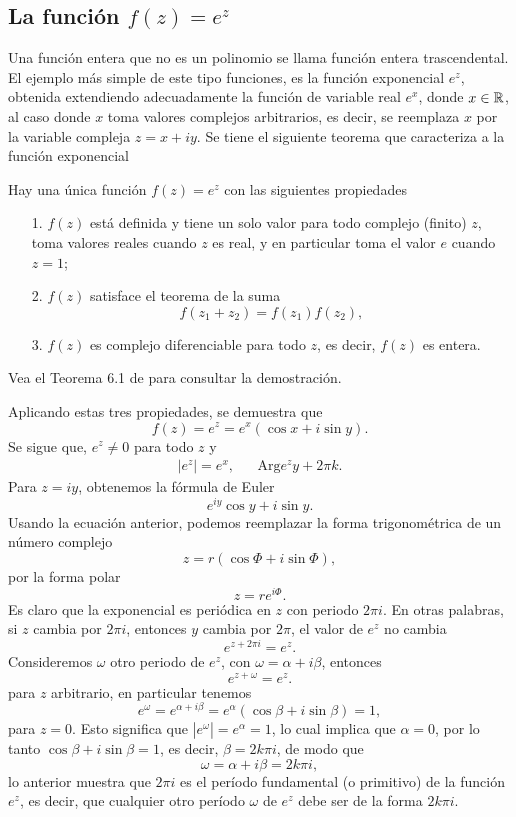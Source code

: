 \subsection{La función $f(z)=e^z$}
Una función entera que no es un polinomio se llama función entera trascendental. El ejemplo más simple de este tipo  funciones, es la función exponencial  $e^z$, obtenida extendiendo adecuadamente la
función de variable real $e^x$, donde $x\in\mathbb{R}$, al caso donde $x$ toma valores complejos arbitrarios, es decir, se reemplaza $x$ por la variable compleja $z = x + iy$. Se tiene el siguiente teorema que caracteriza a la función exponencial
\begin{teor}
	Hay una  única función $f(z) = e^z$ con las siguientes propiedades
	\begin{itemize}
		\item [1.] $f(z)$ está definida y tiene un solo valor para todo complejo (finito) $z$, toma  valores reales cuando $z$ es real, y en particular toma el valor $e$ cuando $z = 1$;
		\item [2.] $f(z)$  satisface el teorema de la suma
		$$f(z_1+z_2)=f(z_1)f(z_2),$$
		\item [3.] $f(z)$ es complejo diferenciable para todo $z$, es decir, $f(z)$ es entera.
	\end{itemize}
Vea el Teorema 6.1 de \cite{silverman} para consultar la demostración. 
\end{teor}
Aplicando estas tres propiedades, se demuestra que 
$$f(z)=e^z=e^x(\cos x+i\sin y).$$
Se sigue que, $e^z\neq 0$ para todo $z$ y 
\[
	 \begin{array}{ccl}
	 	|e^z|=e^x,&&\mbox{Arg}e^zy+2\pi k.
	 \end{array}
\]
Para $z=iy$, obtenemos la fórmula de Euler
$$e^{iy}\cos y+i \sin y.$$
Usando la ecuación anterior, podemos reemplazar la forma trigonométrica de un número complejo
$$z=r(\cos\Phi+i\sin\Phi),$$
por la forma polar
$$z=re^{i\Phi}.$$
Es claro que la exponencial es periódica en $z$ con periodo $2\pi i$. En otras palabras, si $z$ cambia por $2\pi i$, entonces $y$ cambia por $2\pi$, el valor de $e^z$ no cambia
$$e^{z+2\pi i}=e^z.$$
Consideremos $\omega$ otro periodo de $e^z$, con $\omega=\alpha+i\beta$, entonces 
$$e^{z+\omega}=e^z.$$
para $z$ arbitrario, en particular tenemos
$$e^\omega=e^{\alpha+i\beta}=e^{\alpha}(\cos\beta+i\sin\beta)=1,$$
para $z=0$.  Esto significa que $|e^{\omega}|=e^\alpha=1$, lo cual implica que $\alpha=0$, por lo tanto $\cos\beta+i\sin\beta=1$, es decir, $\beta=2k\pi i$, de modo que 
$$\omega=\alpha+i\beta=2k\pi i,$$
lo anterior muestra que $2\pi i$ es el período fundamental (o primitivo) de la función $e^z$, es decir, que cualquier otro período $\omega$ de $e^z$ debe ser de la forma $2k\pi i$.\\
